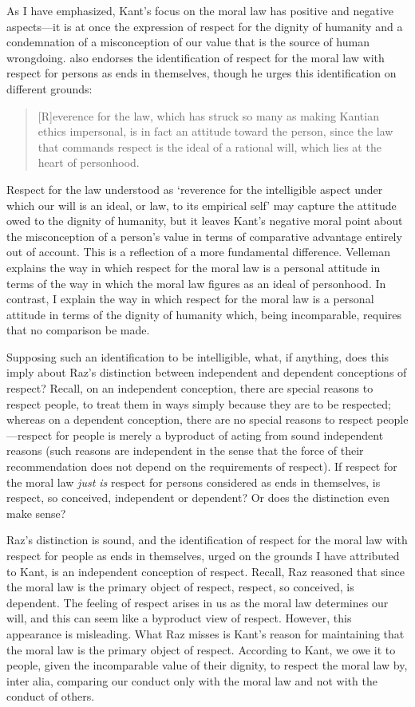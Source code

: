 \documentclass[a4paper,12pt]{article}
\begin{document}
As I have emphasized, Kant's focus on the moral law has positive and negative aspects---it is at once the expression of respect for the dignity of humanity and a condemnation of a misconception of our value that is the source of human wrongdoing. \citet{Velleman:2006nx} also endorses the identification of respect for the moral law with respect for persons as ends in themselves, though he urges this identification on different grounds:
\begin{quote}
	[R]everence for the law, which has struck so many as making Kantian ethics impersonal, is in fact an attitude toward the person, since the law that commands respect is the ideal of a rational will, which lies at the heart of personhood. \citep[81]{Velleman:2006nx}
\end{quote}
Respect for the law understood as `reverence for the intelligible aspect under which our will is an ideal, or law, to its empirical self' \citep[80]{Velleman:2006nx} may capture the attitude owed to the dignity of humanity, but it leaves Kant's negative moral point about the misconception of a person's value in terms of comparative advantage entirely out of account. This is a reflection of a more fundamental difference. Velleman explains the way in which respect for the moral law is a personal attitude in terms of the way in which the moral law figures as an ideal of personhood. In contrast, I explain the way in which respect for the moral law is a personal attitude in terms of the dignity of humanity which, being incomparable, requires that no comparison be made.

Supposing such an identification to be intelligible, what, if anything, does this imply about Raz's distinction between independent and dependent conceptions of respect? Recall, on an independent conception, there are special reasons to respect people, to treat them in ways simply because they are to be respected; whereas on a dependent conception, there are no special reasons to respect people---respect for people is merely a byproduct of acting from sound independent reasons (such reasons are independent in the sense that the force of their recommendation does not depend on the requirements of respect). If respect for the moral law \emph{just is} respect for persons considered as ends in themselves, is respect, so conceived, independent or dependent? Or does the distinction even make sense?

Raz's distinction is sound, and the identification of respect for the moral law with respect for people as ends in themselves, urged on the grounds I have attributed to Kant, is an independent conception of respect. Recall, Raz reasoned that since the moral law is the primary object of respect, respect, so conceived, is dependent. The feeling of respect arises in us as the moral law determines our will, and this can seem like a byproduct view of respect. However, this appearance is misleading. What Raz misses is Kant's reason for maintaining that the moral law is the primary object of respect. According to Kant, we owe it to people, given the incomparable value of their dignity, to respect the moral law by, inter alia, comparing our conduct only with the moral law and not with the conduct of others.
\end{document}
